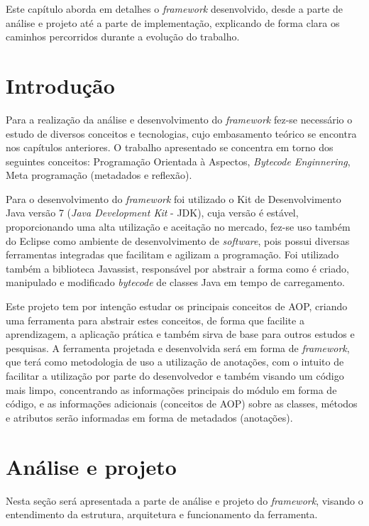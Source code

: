 \documentclass[tc,oneside]{iiufrgs}
\begin{document}
Este capítulo aborda em detalhes o \textit{framework} desenvolvido, desde a parte de análise  e projeto até a parte de implementação, explicando de forma clara os caminhos percorridos durante a evolução do trabalho.

\section{Introdução}

Para a realização da análise e desenvolvimento do \textit{framework} fez-se necessário o estudo de diversos conceitos e tecnologias,  cujo embasamento teórico se encontra nos capítulos anteriores. O trabalho apresentado se concentra em torno dos seguintes conceitos: Programação Orientada à Aspectos, \textit{Bytecode Enginnering}, Meta programação (metadados e reflexão).

Para o desenvolvimento do \textit{framework} foi utilizado o Kit de Desenvolvimento Java versão 7 (\textit{Java Development Kit} - JDK), cuja versão é estável, proporcionando uma alta utilização e aceitação no mercado, fez-se uso também do Eclipse como ambiente de desenvolvimento de \textit{software}, pois possui diversas ferramentas integradas que facilitam e agilizam a programação. Foi utilizado também a biblioteca Javassist, responsável por abstrair a forma como é criado, manipulado e modificado \textit{bytecode} de classes Java em tempo de carregamento. 

Este projeto tem por intenção estudar os principais conceitos de AOP,  criando uma ferramenta para abstrair estes conceitos, de forma que facilite a aprendizagem, a aplicação prática e também sirva de base para outros estudos e pesquisas. A ferramenta projetada e desenvolvida será em forma de \textit{framework}, que terá como metodologia de uso a utilização de anotações, com o intuito de facilitar a utilização por parte do desenvolvedor e também visando um código mais limpo, concentrando as informações principais do módulo em forma de código, e as informações adicionais (conceitos de AOP) sobre as classes, métodos e atributos serão informadas em forma de metadados (anotações).
\section{Análise e projeto}

Nesta seção será apresentada a parte de análise e projeto do \textit{framework}, visando o entendimento da estrutura, arquitetura e funcionamento da ferramenta.
\end{document}
